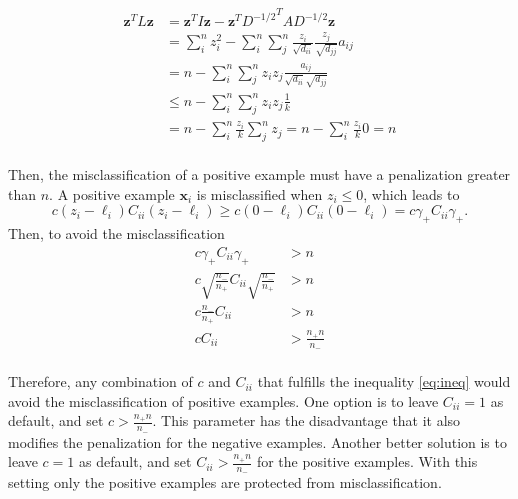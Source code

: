 \documentclass[]{scrartcl}
\begin{document}
	\begin{equation} \tag{S.2}
		\begin{split}
			\mathbf{z}^T L \mathbf{z} & = \mathbf{z}^T I \mathbf{z} - \mathbf{z}^T {D^{-1/2}}^T A D^{-1/2} \mathbf{z} \\
			& = \sum_{i}^{n} z_{i}^{2} -  \sum_{i}^{n}  \sum_{j}^{n} \frac{z_{i}}{\sqrt{d_{ii}}} \frac{z_{j}}{\sqrt{d_{jj}}} a_{ij} \\
			& = n -  \sum_{i}^{n}  \sum_{j}^{n} z_{i} z_{j} \frac{a_{ij}}{\sqrt{d_{ii}} \sqrt{d_{jj}}}   \\
			& \leq n -  \sum_{i}^{n}  \sum_{j}^{n} z_{i} z_{j} \frac{1}{k}   \\
			& = n -  \sum_{i}^{n} \frac{z_{i}}{k} \sum_{j}^{n}  z_{j} =  n -  \sum_{i}^{n} \frac{z_{i}}{k} 0 = n \\
		\end{split}
	\end{equation}

	\noindent Then, the misclassification of a positive example must have a penalization greater than $n$. A positive example $\mathbf{x}_{i}$ is misclassified when $z_{i} \leq 0$, which leads to
	\begin{equation} \tag{S.3}
		c (z_{i} - \ell_{i}) C_{ii} (z_{i} - \ell_{i}) \geq c (0 - \ell_{i}) C_{ii} (0 - \ell_{i}) = c \gamma_{+} C_{ii} \gamma_{+} .
	\end{equation}
	\noindent Then, to avoid the misclassification
	\begin{equation} \label{eq:ineq} \tag{S.4}
		\begin{split}
			c \gamma_{+} C_{ii} \gamma_{+} & > n \\
			c \sqrt{\frac{n_{-}}{n_{+}}} C_{ii} \sqrt{\frac{n_{-}}{n_{+}}} & > n \\
			c \frac{n_{-}}{n_{+}} C_{ii} & > n \\
			c C_{ii} & > \frac{n_{+} n}{n_{-}} \\
		\end{split}
	\end{equation}

	\noindent Therefore, any combination of $c$ and $C_{ii}$ that fulfills the inequality \ref{eq:ineq} would avoid the misclassification of positive examples. One option is to leave $C_{ii}=1$ as default, and set $c > \frac{n_{+} n}{n_{-}}$. This parameter has the disadvantage that it also modifies the penalization for the negative examples. Another better solution is to leave $c = 1$ as default, and set $C_{ii} > \frac{n_{+} n}{n_{-}}$ for the positive examples. With this setting only the positive examples are protected from misclassification.
\end{document}

